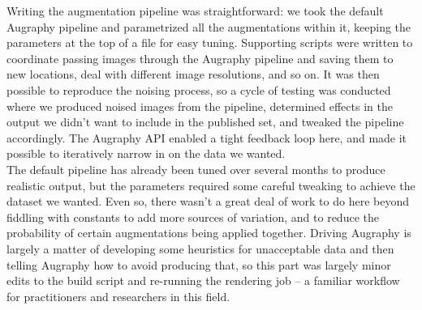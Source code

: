 \documentclass[runningheads]{llncs}
\begin{document}
Writing the augmentation pipeline was straightforward: we took the default Augraphy pipeline and parametrized all the augmentations within it, keeping the parameters at the top of a file for easy tuning. Supporting scripts were written to coordinate passing images through the Augraphy pipeline and saving them to new locations, deal with different image resolutions, and so on. It was then possible to reproduce the noising process, so a cycle of testing was conducted where we produced noised images from the pipeline, determined effects in the output we didn't want to include in the published set, and tweaked the pipeline accordingly. The Augraphy API enabled a tight feedback loop here, and made it possible to iteratively narrow in on the data we wanted.\\

The default pipeline has already been tuned over several months to produce realistic output, but the parameters required some careful tweaking to achieve the dataset we wanted. Even so, there wasn't a great deal of work to do here beyond fiddling with constants to add more sources of variation, and to reduce the probability of certain augmentations being applied together. Driving Augraphy is largely a matter of developing some heuristics for unacceptable data and then telling Augraphy how to avoid producing that, so this part was largely minor edits to the build script and re-running the rendering job -- a familiar workflow for practitioners and researchers in this field.\\



\end{document}
